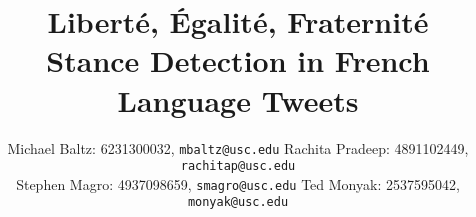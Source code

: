 \documentclass[journal]{IEEEtran}
\newcommand{\code}[1]{\texttt{#1}}
\begin{document}
%
\title{Libert\'{e}, \'{E}galit\'{e}, Fraternit\'{e} \\ Stance Detection in French Language Tweets}
%
%
%

\author{Michael Baltz: 6231300032, \code{mbaltz@usc.edu}
	Rachita Pradeep: 4891102449, \code{rachitap@usc.edu} \\
	Stephen Magro: 4937098659, \code{smagro@usc.edu} 
Ted Monyak: 2537595042, \code{monyak@usc.edu}}

% 









\maketitle



%
\IEEEpeerreviewmaketitle
\end{document}
